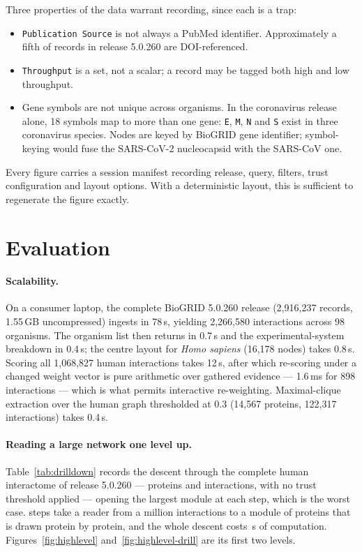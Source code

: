 \documentclass[conference]{IEEEtran}
\begin{document}
Three properties of the data warrant recording, since each is a trap:
\begin{itemize}
  \item \texttt{Publication Source} is not always a PubMed identifier. Approximately a
        fifth of records in release 5.0.260 are DOI-referenced.
  \item \texttt{Throughput} is a set, not a scalar; a record may be tagged both high and
        low throughput.
  \item Gene symbols are not unique across organisms. In the coronavirus release alone,
        18 symbols map to more than one gene: \texttt{E}, \texttt{M}, \texttt{N} and
        \texttt{S} exist in three coronavirus species. Nodes are keyed by BioGRID gene
        identifier; symbol-keying would fuse the SARS-CoV-2 nucleocapsid with the
        SARS-CoV one.
\end{itemize}

Every figure carries a session manifest recording release, query, filters, trust
configuration and layout options. With a deterministic layout, this is sufficient to
regenerate the figure exactly.

\section{Evaluation}
\label{sec:evaluation}

\paragraph{Scalability.} On a consumer laptop, the complete BioGRID 5.0.260 release
(2{,}916{,}237 records, 1.55\,GB uncompressed) ingests in 78\,s, yielding 2{,}266{,}580
interactions across 98 organisms. The organism list then returns in 0.7\,s and the
experimental-system breakdown in 0.4\,s; the centre layout for \emph{Homo sapiens}
(16{,}178 nodes) takes 0.8\,s. Scoring all 1{,}068{,}827 human interactions takes
12\,s, after which re-scoring under a changed weight vector is pure arithmetic over
gathered evidence --- 1.6\,ms for 898 interactions --- which is what permits
interactive re-weighting. Maximal-clique extraction over the human graph thresholded at
$0.3$ (14{,}567 proteins, 122{,}317 interactions) takes 0.4\,s.

\paragraph{Reading a large network one level up.} Table~\ref{tab:drilldown} records the
descent through the complete human interactome of release 5.0.260 --- \HumanProteins{}
proteins and \HumanInteractions{} interactions, with no trust threshold applied ---
opening the largest module at each step, which is the worst case. \HumanSteps{} steps
take a reader from a million interactions to a module of \HumanLeaf{} proteins that is
drawn protein by protein, and the whole descent costs \HumanDescentSeconds{}\,s of
computation. Figures~\ref{fig:highlevel}
and~\ref{fig:highlevel-drill} are its first two levels.
\end{document}
